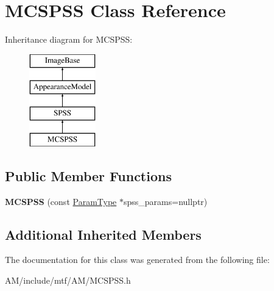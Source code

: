 \hypertarget{classMCSPSS}{\section{M\-C\-S\-P\-S\-S Class Reference}
\label{classMCSPSS}
}
Inheritance diagram for M\-C\-S\-P\-S\-S\-:\begin{figure}[H]
\begin{center}
\leavevmode
\includegraphics[height=4.000000cm]{classMCSPSS}
\end{center}
\end{figure}
\subsection*{Public Member Functions}
\begin{DoxyCompactItemize}
\item 
\hypertarget{classMCSPSS_a25b34e52e7d3ab0ec047cc8c0fa39ea2}{{\bfseries M\-C\-S\-P\-S\-S} (const \hyperlink{structSPSSParams}{Param\-Type} $\ast$spss\-\_\-params=nullptr)}\label{classMCSPSS_a25b34e52e7d3ab0ec047cc8c0fa39ea2}

\end{DoxyCompactItemize}
\subsection*{Additional Inherited Members}


The documentation for this class was generated from the following file\-:\begin{DoxyCompactItemize}
\item 
A\-M/include/mtf/\-A\-M/M\-C\-S\-P\-S\-S.\-h\end{DoxyCompactItemize}
